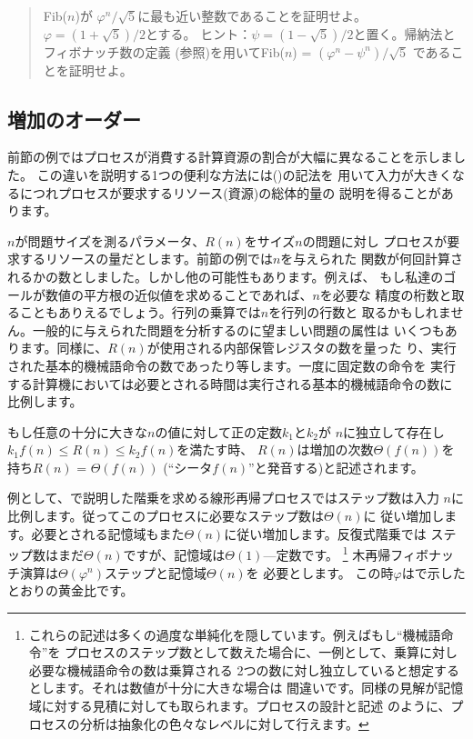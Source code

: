 \begin{quote}
 Fib(\( n \))が
\( \varphi^n / \sqrt{5} \)に最も近い整数であることを証明せよ。
\( \varphi = (1 + \sqrt{5}) / 2 \)とする。
ヒント：\( \psi = (1 - \sqrt{5}) / 2 \)と置く。帰納法とフィボナッチ数の定義
(参照)を用いてFib(\( n \)) = \( (\varphi^n - \psi^n) / \sqrt{5} \)
であることを証明せよ。
\end{quote}

\subsection{増加のオーダー}
\label{Section 1.2.3}



前節の例ではプロセスが消費する計算資源の割合が大幅に異なることを示しました。
この違いを説明する1つの便利な方法には()の記法を
用いて入力が大きくなるにつれプロセスが要求するリソース(資源)の総体的量の
説明を得ることがあります。



\( n \)が問題サイズを測るパラメータ、\( R(n) \)をサイズ\( n \)の問題に対し
プロセスが要求するリソースの量だとします。前節の例では\( n \)を与えられた
関数が何回計算されるかの数としました。しかし他の可能性もあります。例えば、
もし私達のゴールが数値の平方根の近似値を求めることであれば、\( n \)を必要な
精度の桁数と取ることもありえるでしょう。行列の乗算では\( n \)を行列の行数と
取るかもしれません。一般的に与えられた問題を分析するのに望ましい問題の属性は
いくつもあります。同様に、\( R(n) \)が使用される内部保管レジスタの数を量った
り、実行された基本的機械語命令の数であったり等します。一度に固定数の命令を
実行する計算機においては必要とされる時間は実行される基本的機械語命令の数に
比例します。



もし任意の十分に大きな\( n \)の値に対して正の定数\( k_1 \)と\( k_2 \)が
\( n \)に独立して存在し\( k_1f(n) \le R(n) \le k_2f(n) \)を満たす時、
\( R(n) \)は増加の次数\( \Theta(f(n)) \)を持ち\( R(n) \) = \( \Theta(f(n)) \)
(``シータ\( f(n) \)''と発音する)と記述されます。




例として、で説明した階乗を求める線形再帰プロセスではステップ数は入力
\( n \)に比例します。従ってこのプロセスに必要なステップ数は\( \Theta(n) \)に
従い増加します。必要とされる記憶域もまた\( \Theta(n) \)に従い増加します。反復式階乗では
ステップ数はまだ\( \Theta(n) \)ですが、記憶域は\( \Theta(1) \)---定数です。
\footnote{これらの記述は多くの過度な単純化を隠しています。例えばもし``機械語命令''を
プロセスのステップ数として数えた場合に、一例として、乗算に対し必要な機械語命令の数は乗算される
2つの数に対し独立していると想定するとします。それは数値が十分に大きな場合は
間違いです。同様の見解が記憶域に対する見積に対しても取られます。プロセスの設計と記述
のように、プロセスの分析は抽象化の色々なレベルに対して行えます。}
木再帰フィボナッチ演算は\( \Theta(\varphi^n) \)ステップと記憶域\( \Theta(n) \)を
必要とします。
この時\( \varphi \)はで示したとおりの黄金比です。



